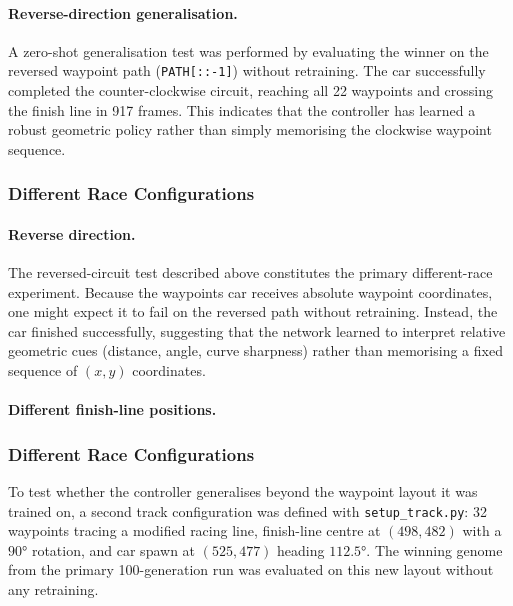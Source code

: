 \documentclass[a4paper]{article}
\begin{document}
\paragraph{Reverse-direction generalisation.}
A zero-shot generalisation test was performed by evaluating the winner
on the reversed waypoint path (\texttt{PATH[::-1]}) without retraining.
The car successfully completed the counter-clockwise circuit,
reaching all 22 waypoints and crossing the finish line in 917 frames.
This indicates that the controller has learned a robust geometric
policy rather than simply memorising the clockwise waypoint sequence.

\subsubsection{Different Race Configurations}
\label{subsubsec:different-races}

\paragraph{Reverse direction.}
The reversed-circuit test described above constitutes the primary
different-race experiment.
Because the waypoints car receives absolute waypoint coordinates,
one might expect it to fail on the reversed path without retraining.
Instead, the car finished successfully, suggesting that the network
learned to interpret relative geometric cues (distance, angle,
curve sharpness) rather than memorising a fixed sequence of
$(x,y)$ coordinates.

\paragraph{Different finish-line positions.}
\subsubsection{Different Race Configurations}
\label{subsubsec:different-races}

To test whether the controller generalises beyond the waypoint layout it was trained
on, a second track configuration was defined with \texttt{setup\_track.py}:
32 waypoints tracing a modified racing line, finish-line centre at $(498, 482)$ with
a $90°$ rotation, and car spawn at $(525, 477)$ heading $112.5°$.
The winning genome from the primary 100-generation run was evaluated on this new
layout without any retraining.
\end{document}
